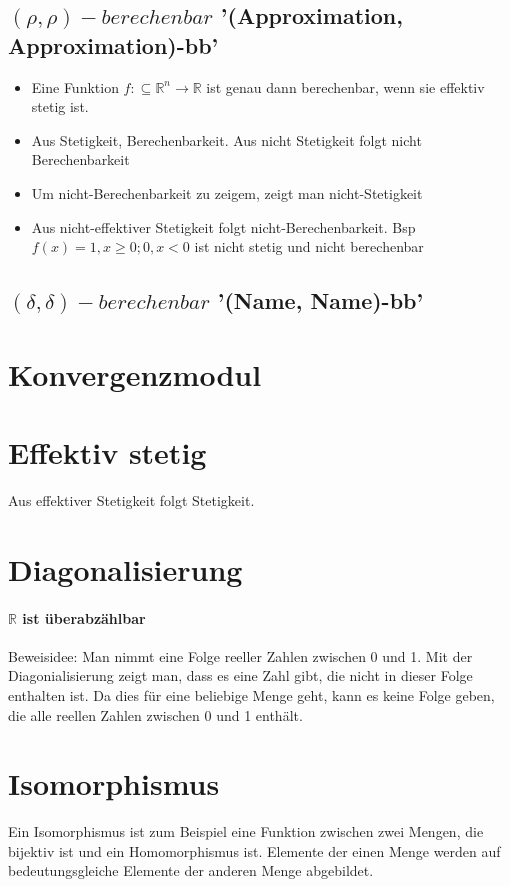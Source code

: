 \documentclass[ngerman]{scrartcl}
\begin{document}
\subsection{$ (\rho, \rho)-berechenbar $ '(Approximation, Approximation)-bb'}
\begin{itemize}
  \item Eine Funktion $ f: \subseteq \mathbb{R}^n \rightarrow \mathbb{R} $ ist genau dann berechenbar, wenn sie effektiv stetig ist.
  \item Aus Stetigkeit, Berechenbarkeit. Aus nicht Stetigkeit folgt nicht Berechenbarkeit
  \item Um nicht-Berechenbarkeit zu zeigem, zeigt man nicht-Stetigkeit 
  \item Aus nicht-effektiver Stetigkeit folgt nicht-Berechenbarkeit. Bsp $  f(x) = 1, x \geq 0; 0, x < 0 $ ist nicht stetig und nicht berechenbar
\end{itemize}

\subsection{$ (\delta, \delta)-berechenbar $ '(Name, Name)-bb'}

\section{Konvergenzmodul}



\section{Effektiv stetig}
Aus effektiver Stetigkeit folgt Stetigkeit. 

\section{Diagonalisierung}
\paragraph{$ \mathbb{R} $ ist überabzählbar}

Beweisidee: Man nimmt eine Folge reeller Zahlen zwischen 0 und 1. Mit der Diagonialisierung zeigt man, dass es eine Zahl gibt, die nicht in dieser Folge enthalten ist. Da dies für eine beliebige Menge geht, kann es keine Folge geben, die alle reellen Zahlen zwischen 0 und 1 enthält.


\section{Isomorphismus}
Ein Isomorphismus ist zum Beispiel eine Funktion zwischen zwei Mengen, die bijektiv ist und ein Homomorphismus ist. Elemente der einen Menge werden auf bedeutungsgleiche Elemente der anderen Menge abgebildet.
\end{document}
